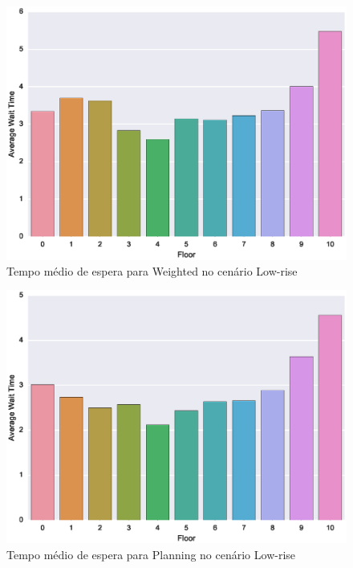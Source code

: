 \begin{figure}[htb!]
  \centering
  \includegraphics[scale=0.8]{img/results/Low-rise/4_Simple_Weighted/averageWaitTime}
  \caption{Tempo médio de espera para Weighted no cenário Low-rise}
  \label{fig:result:low-rise:avgwt:weighted}
\end{figure}

\begin{figure}[htb!]
  \centering
  \includegraphics[scale=0.8]{img/results/Low-rise/5_Planning_Random/averageWaitTime}
  \caption{Tempo médio de espera para Planning no cenário Low-rise}
  \label{fig:result:low-rise:avgwt:planning}
\end{figure}

